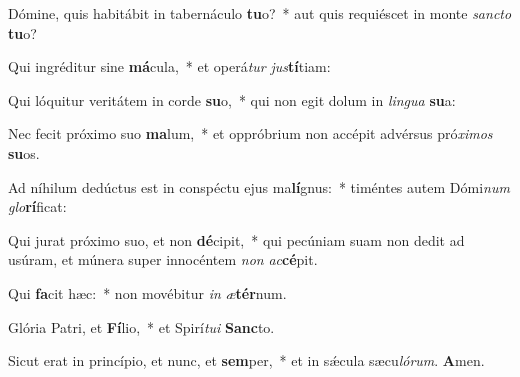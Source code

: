 \item Dómine, quis habitábit in tabernáculo \textbf{tu}o?~* aut quis requiéscet in monte \textit{sanc}\textit{to} \textbf{tu}o?
\item Qui ingréditur sine \textbf{má}cula,~* et operá\textit{tur} \textit{jus}\textbf{tí}tiam:
\item Qui lóquitur veritátem in corde \textbf{su}o,~* qui non egit dolum in \textit{lin}\textit{gua} \textbf{su}a:
\item Nec fecit próximo suo \textbf{ma}lum,~* et oppróbrium non accépit advérsus pró\textit{xi}\textit{mos} \textbf{su}os.
\item Ad níhilum dedúctus est in conspéctu ejus ma\textbf{lí}gnus:~* timéntes autem Dómi\textit{num} \textit{glo}\textbf{rí}ficat:
\item Qui jurat próximo suo, et non \textbf{dé}cipit,~* qui pecúniam suam non dedit ad usúram, et múnera super innocéntem \textit{non} \textit{ac}\textbf{cé}pit.
\item Qui \textbf{fa}cit hæc:~* non movébitur \textit{in} \textit{æ}\textbf{tér}num.
\item Glória Patri, et \textbf{Fí}lio,~* et Spirí\textit{tu}\textit{i} \textbf{Sanc}to.
\item Sicut erat in princípio, et nunc, et \textbf{sem}per,~* et in sǽcula sæcu\textit{ló}\textit{rum}. \textbf{A}men.
